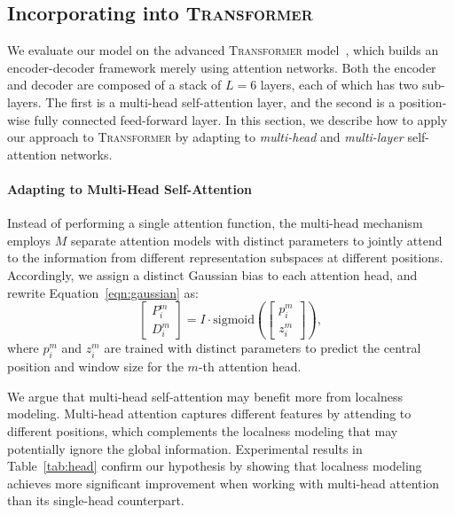 \documentclass[11pt,a4paper]{article}
\begin{document}
\subsection{Incorporating into \textsc{Transformer}}
\label{sec:trans}

We evaluate our model on the advanced \textsc{Transformer} model~\cite{Vaswani:2017:NIPS}, which builds an encoder-decoder framework merely using attention networks.
Both the encoder and decoder are composed of a stack of $L=6$ layers, each of which has two sub-layers.
The first is a multi-head self-attention layer, and the second is a position-wise fully connected feed-forward layer. In this section, we describe how to apply our approach to \textsc{Transformer} by adapting to {\em multi-head} and {\em multi-layer} self-attention networks.


\paragraph{Adapting to Multi-Head Self-Attention}
Instead of performing a single attention function, the multi-head mechanism employs $M$ separate attention models with distinct parameters to jointly attend to the information from different representation subspaces at different positions.
Accordingly, we assign a distinct Gaussian bias to each attention head, and rewrite Equation~\ref{eqn:gaussian} as:
\begin{equation}
 \begin{bmatrix}
 P^m_i\\ 
D^m_i
\end{bmatrix} = I \cdot \text{sigmoid}(\begin{bmatrix}
 p^m_i\\ 
z^m_i
\end{bmatrix}),
\label{eqn:gaussian-multi-head}
\end{equation}
where $p^m_i$ and $z^m_i$ are trained with distinct parameters to predict the central position and window size for the $m$-th attention head. 

We argue that multi-head self-attention may benefit more from localness modeling. Multi-head attention captures different features by attending to different positions, which complements the localness modeling that may potentially ignore the global information. Experimental results in Table~\ref{tab:head} confirm our hypothesis by showing that localness modeling achieves more significant improvement when working with multi-head attention than its single-head counterpart.
\end{document}
